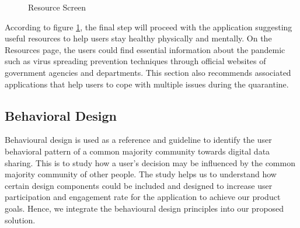 \begin{enumerate}[a)]
\begin{figure}[H]
            \caption{Resource Screen}
            \label{fig:iter3-proto-7}
          \end{figure}
          \par According to figure \ref{fig:iter3-proto-7}, the final step will proceed with the application suggesting useful resources to help users stay healthy physically and mentally. On the Resources page, the users could find essential information about the pandemic such as virus spreading prevention techniques through official websites of government agencies and departments. This section also recommends associated applications that help users to cope with multiple issues during the quarantine.
      \end{enumerate}

  \subsection{Behavioral Design}
    \par Behavioural design is used as a reference and guideline to identify the user behavioral pattern of a
    common majority community towards digital data sharing. This is to study how a user's decision may
    be influenced by the common majority community of other people. The study helps us to understand
    how certain design components could be included and designed to increase user participation and
    engagement rate for the application to achieve our product goals. Hence, we integrate the behavioural
    design principles into our proposed solution.

